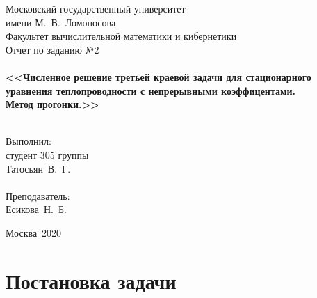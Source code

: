\documentclass[a4paper,12pt,titlepage]{article}
\begin{document}
\begin{titlepage}
    \begin{center}
	{\small \sc Московский государственный университет \\имени М.~В.~Ломоносова\\
	Факультет вычислительной математики и кибернетики\\}
	\vfill
	{\Large \sc Отчет по заданию №2}\\
	~\\
	{\large \bf <<Численное решение третьей краевой задачи для стационарного уравнения теплопроводности с непрерывными коэффицентами.\\
	    Метод прогонки.>>}\\ 
	~\\
    \end{center}
    \begin{flushright}
	\vfill {Выполнил:\\
	студент 305 группы\\
	Татосьян~В.~Г.\\
	~\\
	Преподаватель:\\
	Есикова~Н.~Б.}
    \end{flushright}
    \begin{center}
	\vfill
	{\small Москва\ 2020}
    \end{center}
\end{titlepage}

\tableofcontents
\newpage

\section{Постановка задачи}
\end{document}
